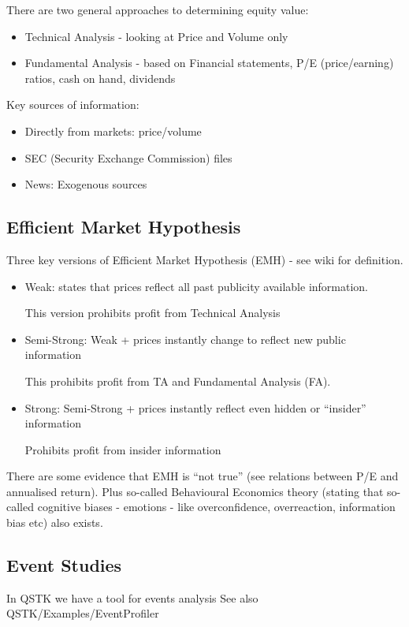 \documentclass{scrartcl}
\begin{document}
There are two general approaches to determining equity value:
\begin{itemize}
\item Technical Analysis - looking at Price and Volume only
\item Fundamental Analysis - based on Financial statements, P/E (price/earning)
  ratios, cash on hand, dividends
\end{itemize}
Key sources of information:
\begin{itemize}
\item Directly from markets: price/volume
\item SEC (Security Exchange Commission) files
\item News: Exogenous sources
\end{itemize}

\subsection{Efficient Market Hypothesis}
\label{sec:EfficientMarketHypothesis}
Three key versions of Efficient Market Hypothesis (EMH) - see wiki for
definition.

\begin{itemize}
\item Weak: states that prices reflect all past publicity available information.

  This version prohibits profit from Technical Analysis
\item Semi-Strong: Weak + prices instantly change to reflect new public
  information

  This prohibits profit from TA and Fundamental Analysis (FA).

\item Strong: Semi-Strong + prices instantly reflect even hidden or ``insider''
  information

  Prohibits profit from insider information
\end{itemize}

There are some evidence that EMH is ``not true'' (see relations between P/E and
annualised return). Plus so-called Behavioural Economics theory (stating that
so-called cognitive biases - emotions - like overconfidence, overreaction,
information bias etc) also exists.

\subsection{Event Studies}
\label{sec:EventStudies}
In QSTK we have a tool for events analysis See also QSTK/Examples/EventProfiler
\end{document}
